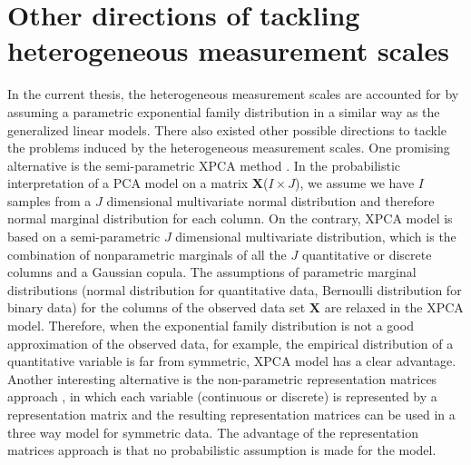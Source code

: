 \section{Other directions of tackling heterogeneous measurement scales}
In the current thesis, the heterogeneous measurement scales are accounted for by assuming a parametric exponential family distribution in a similar way as the generalized linear models. There also existed other possible directions \cite{kiers1989three, anderson2018xpca, de2009gifi} to tackle the problems induced by the heterogeneous measurement scales. One promising alternative is the semi-parametric XPCA method \cite{anderson2018xpca}. In the probabilistic interpretation of a PCA model on a matrix $\mathbf{X}$($I\times J$), we assume we have $I$ samples from a $J$ dimensional multivariate normal distribution and therefore normal marginal distribution for each column. On the contrary, XPCA model is based on a semi-parametric $J$ dimensional multivariate distribution, which is the combination of nonparametric marginals of all the $J$ quantitative or discrete columns and a Gaussian copula. The assumptions of parametric marginal distributions (normal distribution for quantitative data, Bernoulli distribution for binary data) for the columns of the observed data set $\mathbf{X}$ are relaxed in the XPCA model. Therefore, when the exponential family distribution is not a good approximation of the observed data, for example, the empirical distribution of a quantitative variable is far from symmetric, XPCA model has a clear advantage. Another interesting alternative is the non-parametric representation matrices approach \cite{kiers1989three}, in which each variable (continuous or discrete) is represented by a representation matrix and the resulting representation matrices can be used in a three way model for symmetric data. The advantage of the representation matrices approach is that no probabilistic assumption is made for the model.

